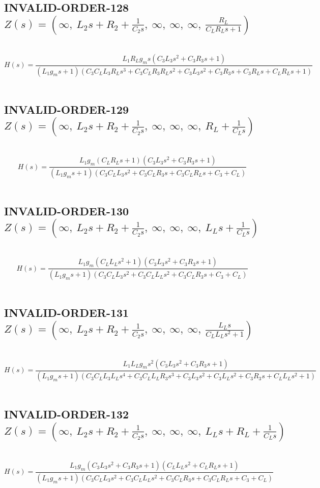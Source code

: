 \documentclass{article}
\begin{document}
\subsection{INVALID-ORDER-128 $Z(s) = \left( \infty, \  L_{2} s + R_{2} + \frac{1}{C_{2} s}, \  \infty, \  \infty, \  \infty, \  \frac{R_{L}}{C_{L} R_{L} s + 1}\right)$ } \ 
\textbf{\[H(s) = \frac{L_{1} R_{L} g_{m} s \left(C_{3} L_{3} s^{2} + C_{3} R_{3} s + 1\right)}{\left(L_{1} g_{m} s + 1\right) \left(C_{3} C_{L} L_{3} R_{L} s^{3} + C_{3} C_{L} R_{3} R_{L} s^{2} + C_{3} L_{3} s^{2} + C_{3} R_{3} s + C_{3} R_{L} s + C_{L} R_{L} s + 1\right)}\] } \ 
\subsection{INVALID-ORDER-129 $Z(s) = \left( \infty, \  L_{2} s + R_{2} + \frac{1}{C_{2} s}, \  \infty, \  \infty, \  \infty, \  R_{L} + \frac{1}{C_{L} s}\right)$ } \ 
\textbf{\[H(s) = \frac{L_{1} g_{m} \left(C_{L} R_{L} s + 1\right) \left(C_{3} L_{3} s^{2} + C_{3} R_{3} s + 1\right)}{\left(L_{1} g_{m} s + 1\right) \left(C_{3} C_{L} L_{3} s^{2} + C_{3} C_{L} R_{3} s + C_{3} C_{L} R_{L} s + C_{3} + C_{L}\right)}\] } \ 
\subsection{INVALID-ORDER-130 $Z(s) = \left( \infty, \  L_{2} s + R_{2} + \frac{1}{C_{2} s}, \  \infty, \  \infty, \  \infty, \  L_{L} s + \frac{1}{C_{L} s}\right)$ } \ 
\textbf{\[H(s) = \frac{L_{1} g_{m} \left(C_{L} L_{L} s^{2} + 1\right) \left(C_{3} L_{3} s^{2} + C_{3} R_{3} s + 1\right)}{\left(L_{1} g_{m} s + 1\right) \left(C_{3} C_{L} L_{3} s^{2} + C_{3} C_{L} L_{L} s^{2} + C_{3} C_{L} R_{3} s + C_{3} + C_{L}\right)}\] } \ 
\subsection{INVALID-ORDER-131 $Z(s) = \left( \infty, \  L_{2} s + R_{2} + \frac{1}{C_{2} s}, \  \infty, \  \infty, \  \infty, \  \frac{L_{L} s}{C_{L} L_{L} s^{2} + 1}\right)$ } \ 
\textbf{\[H(s) = \frac{L_{1} L_{L} g_{m} s^{2} \left(C_{3} L_{3} s^{2} + C_{3} R_{3} s + 1\right)}{\left(L_{1} g_{m} s + 1\right) \left(C_{3} C_{L} L_{3} L_{L} s^{4} + C_{3} C_{L} L_{L} R_{3} s^{3} + C_{3} L_{3} s^{2} + C_{3} L_{L} s^{2} + C_{3} R_{3} s + C_{L} L_{L} s^{2} + 1\right)}\] } \ 
\subsection{INVALID-ORDER-132 $Z(s) = \left( \infty, \  L_{2} s + R_{2} + \frac{1}{C_{2} s}, \  \infty, \  \infty, \  \infty, \  L_{L} s + R_{L} + \frac{1}{C_{L} s}\right)$ } \ 
\textbf{\[H(s) = \frac{L_{1} g_{m} \left(C_{3} L_{3} s^{2} + C_{3} R_{3} s + 1\right) \left(C_{L} L_{L} s^{2} + C_{L} R_{L} s + 1\right)}{\left(L_{1} g_{m} s + 1\right) \left(C_{3} C_{L} L_{3} s^{2} + C_{3} C_{L} L_{L} s^{2} + C_{3} C_{L} R_{3} s + C_{3} C_{L} R_{L} s + C_{3} + C_{L}\right)}\] } \ 
\end{document}

